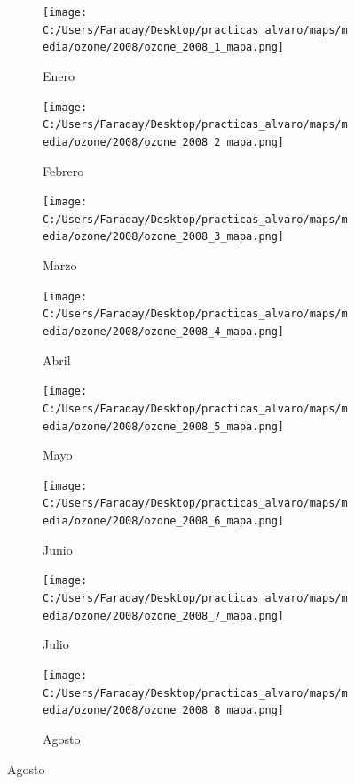 \documentclass[12pt]{beamer}
\begin{document}
\begin{frame}[squeeze]
\tiny
\begin{figure}[H]
\centering
\begin{subfigure}[H]{0.20\textwidth}
\texttt{[image: C:/Users/Faraday/Desktop/practicas\_alvaro/maps/media/ozone/2008/ozone\_2008\_1\_mapa.png]}
\captionsetup{labelformat=empty}
\caption{\scriptsize Enero}
\label{fig:map-ozone-2008-1}
\end{subfigure}
%
\begin{subfigure}[H]{0.20\textwidth}
\texttt{[image: C:/Users/Faraday/Desktop/practicas\_alvaro/maps/media/ozone/2008/ozone\_2008\_2\_mapa.png]}
\captionsetup{labelformat=empty}
\caption{\scriptsize Febrero}
\label{fig:map-ozone-2008-2}
\end{subfigure}
%
\begin{subfigure}[H]{0.20\textwidth}
\texttt{[image: C:/Users/Faraday/Desktop/practicas\_alvaro/maps/media/ozone/2008/ozone\_2008\_3\_mapa.png]}
\captionsetup{labelformat=empty}
\caption{\scriptsize Marzo}
\label{fig:map-ozone-2008-3}
\end{subfigure}
%
\begin{subfigure}[H]{0.20\textwidth}
\texttt{[image: C:/Users/Faraday/Desktop/practicas\_alvaro/maps/media/ozone/2008/ozone\_2008\_4\_mapa.png]}
\captionsetup{labelformat=empty}
\caption{\scriptsize Abril}
\label{fig:map-ozone-2008-4}
\end{subfigure}

\begin{subfigure}[H]{0.20\textwidth}
\texttt{[image: C:/Users/Faraday/Desktop/practicas\_alvaro/maps/media/ozone/2008/ozone\_2008\_5\_mapa.png]}
\captionsetup{labelformat=empty}
\caption{\scriptsize Mayo}
\label{fig:map-ozone-2008-5}
\end{subfigure}
%
\begin{subfigure}[H]{0.20\textwidth}
\texttt{[image: C:/Users/Faraday/Desktop/practicas\_alvaro/maps/media/ozone/2008/ozone\_2008\_6\_mapa.png]}
\captionsetup{labelformat=empty}
\caption{\scriptsize Junio}
\label{fig:map-ozone-2008-6}
\end{subfigure}
%
\begin{subfigure}[H]{0.20\textwidth}
\texttt{[image: C:/Users/Faraday/Desktop/practicas\_alvaro/maps/media/ozone/2008/ozone\_2008\_7\_mapa.png]}
\captionsetup{labelformat=empty}
\caption{\scriptsize Julio}
\label{fig:map-ozone-2008-7}
\end{subfigure}
%
\begin{subfigure}[H]{0.20\textwidth}
\texttt{[image: C:/Users/Faraday/Desktop/practicas\_alvaro/maps/media/ozone/2008/ozone\_2008\_8\_mapa.png]}
\captionsetup{labelformat=empty}
\caption{\scriptsize Agosto}
\label{fig:map-ozone-2008-8}
\end{subfigure}


\end{figure}
\end{frame}
\end{document}
